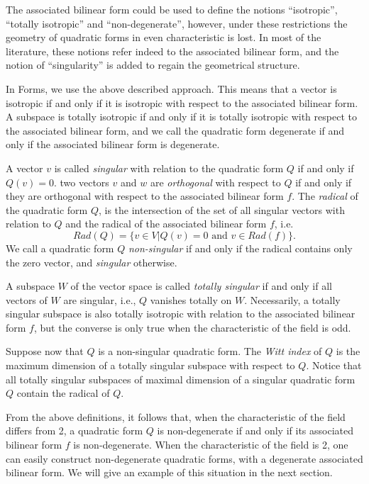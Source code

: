 \documentclass[a4paper,11pt]{report}
\begin{document}
{{ The associated bilinear form could be used to define the notions
``isotropic'', ``totally isotropic'' and ``non-degenerate'', however, under
these restrictions the geometry of quadratic forms in even characteristic is
lost. In most of the literature, these notions refer indeed to the associated
bilinear form, and the notion of ``singularity'' is added to regain the
geometrical structure. 

In \textsf{Forms}, we use the above described approach. This means that a vector is isotropic
if and only if it is isotropic with respect to the associated bilinear form. A
subspace is totally isotropic if and only if it is totally isotropic with
respect to the associated bilinear form, and we call the quadratic form
degenerate if and only if the associated bilinear form is degenerate. 

 A vector $v$ is called \emph{singular} with relation to the quadratic form $Q$ if and only if $Q(v)=0$. two vectors $v$ and $w$ are \emph{orthogonal} with respect to $Q$ if and only if they are orthogonal with respect to the associated bilinear
form $f$. The \emph{radical} of the quadratic form $Q$, is the intersection of the set of all singular vectors with relation to $Q$ and the radical of the associated bilinear form $f$, i.e. 
\[Rad(Q) = \{v \in V | Q(v) = 0\,\, \mathrm{and}\,\, v \in Rad(f)\}.\]
  We call a quadratic form $Q$ \emph{non-singular} if and only if the radical contains only the zero vector, and \emph{singular} otherwise. 

 A subspace $W$ of the vector space is called \emph{totally singular} if and only if all vectors of $W$ are singular, i.e., $Q$ vanishes totally on $W$. Necessarily, a totally singular subspace is also totally isotropic with
relation to the associated bilinear form $f$, but the converse is only true when the characteristic of the field is odd. 

Suppose now that $Q$ is a non-singular quadratic form. The \emph{Witt index} of $Q$ is the maximum dimension of a totally singular subspace with respect to $Q$. Notice that all totally singular subspaces of maximal dimension of a
singular quadratic form $Q$ contain the radical of $Q$. 

 From the above definitions, it follows that, when the characteristic of the
field differs from 2, a quadratic form $Q$ is non-degenerate if and only if its associated bilinear form $f$ is non-degenerate. When the characteristic of the field is 2, one can easily
construct non-degenerate quadratic forms, with a degenerate associated
bilinear form. We will give an example of this situation in the next section. 
}}
\end{document}

